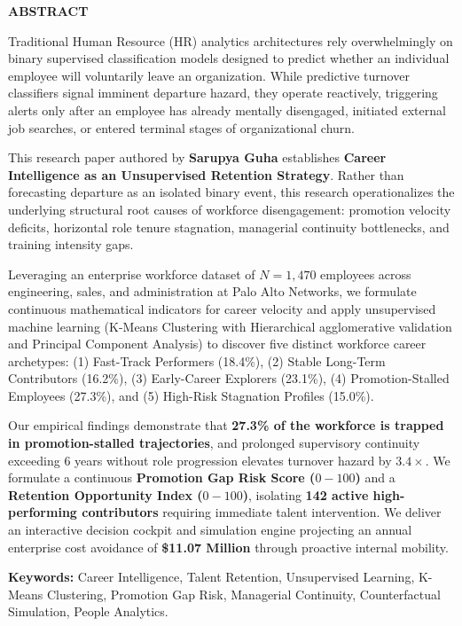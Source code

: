 \documentclass[12pt,a4paper,oneside]{article}
\newcommand{\AuthorName}{Sarupya Guha}
\newcommand{\TargetEnterprise}{Palo Alto Networks}
\begin{document}
\begin{tcolorbox}[colback=white,colframe=black,arc=0mm,boxrule=1pt,width=\textwidth]
\fontsize{9}{11.5}\selectfont
\textbf{ABSTRACT}\par
Traditional Human Resource (HR) analytics architectures rely overwhelmingly on binary supervised classification models designed to predict whether an individual employee will voluntarily leave an organization. While predictive turnover classifiers signal imminent departure hazard, they operate reactively, triggering alerts only after an employee has already mentally disengaged, initiated external job searches, or entered terminal stages of organizational churn.

This research paper authored by \textbf{\AuthorName} establishes \textbf{Career Intelligence as an Unsupervised Retention Strategy}. Rather than forecasting departure as an isolated binary event, this research operationalizes the underlying structural root causes of workforce disengagement: promotion velocity deficits, horizontal role tenure stagnation, managerial continuity bottlenecks, and training intensity gaps. 

Leveraging an enterprise workforce dataset of $N = 1,470$ employees across engineering, sales, and administration at \TargetEnterprise, we formulate continuous mathematical indicators for career velocity and apply unsupervised machine learning (K-Means Clustering with Hierarchical agglomerative validation and Principal Component Analysis) to discover five distinct workforce career archetypes: (1) Fast-Track Performers (18.4\%), (2) Stable Long-Term Contributors (16.2\%), (3) Early-Career Explorers (23.1\%), (4) Promotion-Stalled Employees (27.3\%), and (5) High-Risk Stagnation Profiles (15.0\%).

Our empirical findings demonstrate that \textbf{27.3\% of the workforce is trapped in promotion-stalled trajectories}, and prolonged supervisory continuity exceeding $6$ years without role progression elevates turnover hazard by $3.4\times$. We formulate a continuous \textbf{Promotion Gap Risk Score ($0-100$)} and a \textbf{Retention Opportunity Index ($0-100$)}, isolating \textbf{142 active high-performing contributors} requiring immediate talent intervention. We deliver an interactive decision cockpit and simulation engine projecting an annual enterprise cost avoidance of \textbf{\$11.07 Million} through proactive internal mobility.

\vspace{0.03in}
\textbf{Keywords:} Career Intelligence, Talent Retention, Unsupervised Learning, K-Means Clustering, Promotion Gap Risk, Managerial Continuity, Counterfactual Simulation, People Analytics.
\end{tcolorbox}
\end{document}
